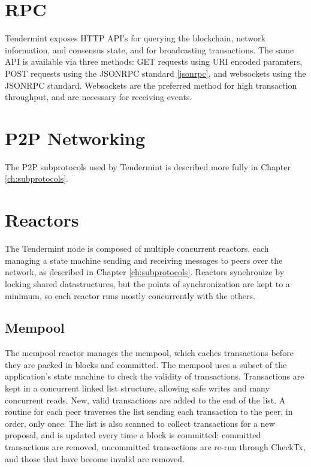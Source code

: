 \section{RPC}

Tendermint exposes HTTP API's for querying the blockchain, network information, and consensus state, and for broadcasting transactions.
The same API is available via three methods: GET requests using URI encoded paramters, POST requests using the JSONRPC standard \ref{jsonrpc}, 
and websockets using the JSONRPC standard. Websockets are the preferred method for high transaction throughput, 
and are necessary for receiving events.


\section{P2P Networking}

The P2P subprotocols used by Tendermint is described more fully in Chapter \ref{ch:subprotocols}.

\section{Reactors}

The Tendermint node is composed of multiple concurrent reactors, 
each managing a state machine sending and receiving messages to peers over the network, as described in Chapter \ref{ch:subprotocols}.
Reactors synchronize by locking shared datastructures, but the points of synchronization are kept to a minimum,
so each reactor runs mostly concurrently with the others.

\subsection{Mempool}

The mempool reactor manages the mempool, 
which caches transactions before they are packed in blocks and committed.
The mempool uses a subset of the application's state machine to check the validity of transactions.
Transactions are kept in a concurrent linked list structure, allowing safe writes and many concurrent reads.
New, valid transactions are added to the end of the list. 
A routine for each peer traverses the list sending each transaction to the peer, in order, only once.
The list is also scanned to collect transactions for a new proposal, 
and is updated every time a block is committed: committed transactions are removed, 
uncommitted transactions are re-run through CheckTx, and those that have become invalid are removed.

